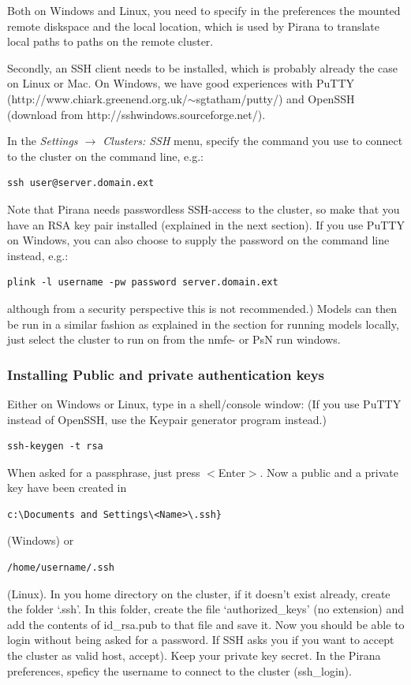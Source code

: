 {{{{\noindent Both on Windows and Linux, you need to specify in the
preferences the mounted remote diskspace and the local location, which
is used by Pirana to translate local paths to paths on the remote
cluster.

\noindent Secondly, an SSH client  needs to be installed, which is probably
already the case on Linux or Mac. On Windows, we have good experiences
with PuTTY
(http://www.chiark.greenend.org.uk/$\sim$sgtatham/putty/) and OpenSSH (download from
http://sshwindows.sourceforge.net/).

In the \textit{Settings $\rightarrow$ Clusters: SSH} menu, specify the
command you use to connect to the cluster on the command line, e.g.:

\begin{lstlisting}
ssh user@server.domain.ext
\end{lstlisting}

\noindent Note that Pirana needs passwordless SSH-access to the cluster, so make
that you have an RSA key pair installed (explained in the next
section). If you use PuTTY on Windows, you can also choose to supply
the password on the command line instead, e.g.:

\begin{lstlisting}
plink -l username -pw password server.domain.ext
\end{lstlisting}

\noindent although from a security perspective this is not recommended.) 
Models can then be run in a similar fashion as explained in
the section for running models locally, just select the cluster to run
on from the nmfe- or PsN run windows.

\subsubsection*{Installing Public and private authentication keys}

Either on Windows or Linux, type in a shell/console window: (If you use PuTTY instead of OpenSSH, use the Keypair generator program instead.)\\
\begin{lstlisting}
ssh-keygen -t rsa
\end{lstlisting}

\noindent When asked for a passphrase, just press $<$Enter$>$.  Now a
public and a private key have been created in
\begin{verbatim}c:\Documents and Settings\<Name>\.ssh}\end{verbatim} (Windows) or
\begin{verbatim}/home/username/.ssh\end{verbatim}(Linux). In you home
directory on the cluster, if it doesn't exist already, create the
folder `.ssh'. In this folder, create the file `authorized\_keys' (no
extension) and add the contents of id\_rsa.pub to that file and save
it. Now you should be able to login without being asked for a password. 
If SSH asks you if you want to accept the cluster as valid host, accept). Keep your private key
secret. In the Pirana preferences, speficy the username to connect to
the cluster (ssh\_login).

}}}}
